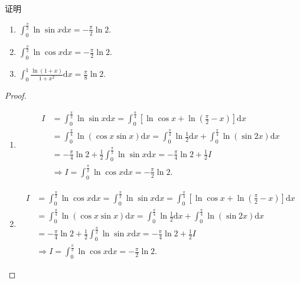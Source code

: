 \documentclass[../../main.tex]{subfiles}
\begin{document}
\begin{proposition}\label{example:常见积分1}
证明
\begin{enumerate}
\item \(\int_{0}^{\frac{\pi}{2}} \ln\sin x\mathrm{d}x=-\frac{\pi}{2}\ln 2.\)

\item \(\int_{0}^{\frac{\pi}{2}} \ln\cos x\mathrm{d}x=-\frac{\pi}{2}\ln 2.\)

\item \(\int_{0}^{1} \frac{\ln(1 + x)}{1 + x^2}\mathrm{d}x=\frac{\pi}{8}\ln 2.\)
\end{enumerate}
\end{proposition}
\begin{proof}
\begin{enumerate}
\item \begin{align*}
I&=\int_0^{\frac{\pi}{2}}{\ln\sin x\mathrm{d}x}=\int_0^{\frac{\pi}{4}}{\left[ \ln\cos x+\ln \left( \frac{\pi}{2}-x \right) \right] \mathrm{d}x}
\\
&=\int_0^{\frac{\pi}{4}}{\ln \left( \cos x\sin x \right) \mathrm{d}x}=\int_0^{\frac{\pi}{4}}{\ln \frac{1}{2}\mathrm{d}x}+\int_0^{\frac{\pi}{4}}{\ln \left( \sin 2x \right) \mathrm{d}x}
\\
&=-\frac{\pi}{4}\ln 2+\frac{1}{2}\int_0^{\frac{\pi}{2}}{\ln\sin x\mathrm{d}x}=-\frac{\pi}{4}\ln 2+\frac{1}{2}I
\\
&\Longrightarrow I=\int_0^{\frac{\pi}{2}}{\ln\cos x\mathrm{d}x}=-\frac{\pi}{2}\ln 2.
\end{align*}

\item \begin{align*}
I&=\int_0^{\frac{\pi}{2}}{\ln\cos x\mathrm{d}x}=\int_0^{\frac{\pi}{2}}{\ln\sin x\mathrm{d}x}=\int_0^{\frac{\pi}{4}}{\left[ \ln\cos x+\ln \left( \frac{\pi}{2}-x \right) \right] \mathrm{d}x}
\\
&=\int_0^{\frac{\pi}{4}}{\ln \left( \cos x\sin x \right) \mathrm{d}x}=\int_0^{\frac{\pi}{4}}{\ln \frac{1}{2}\mathrm{d}x}+\int_0^{\frac{\pi}{4}}{\ln \left( \sin 2x \right) \mathrm{d}x}
\\
&=-\frac{\pi}{4}\ln 2+\frac{1}{2}\int_0^{\frac{\pi}{2}}{\ln\sin x\mathrm{d}x}=-\frac{\pi}{4}\ln 2+\frac{1}{2}I
\\
&\Longrightarrow I=\int_0^{\frac{\pi}{2}}{\ln\cos x\mathrm{d}x}=-\frac{\pi}{2}\ln 2.
\end{align*}


\end{enumerate}
\end{proof}
\end{document}
